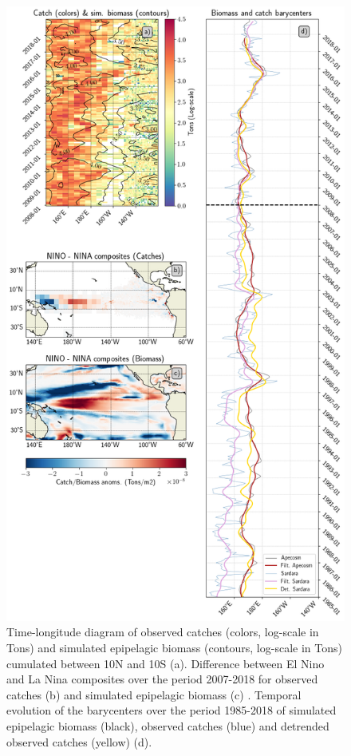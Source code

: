 \begin{figure}[h!tp]
	\centering
	\includegraphics[scale=0.35]{figs/plot_validation_apecosm.png}
	\caption{Time-longitude diagram of observed catches (colors, log-scale in Tons) and simulated epipelagic biomass (contours, log-scale in Tons) cumulated between 10N and 10S (a). Difference between El Nino and La Nina composites over the period 2007-2018 for observed catches (b) and simulated epipelagic biomass (c) . Temporal evolution of the barycenters over the period 1985-2018 of simulated epipelagic biomass (black), observed catches (blue) and detrended observed catches (yellow) (d).}
	\label{fig:apecosm_validation}
\end{figure}

